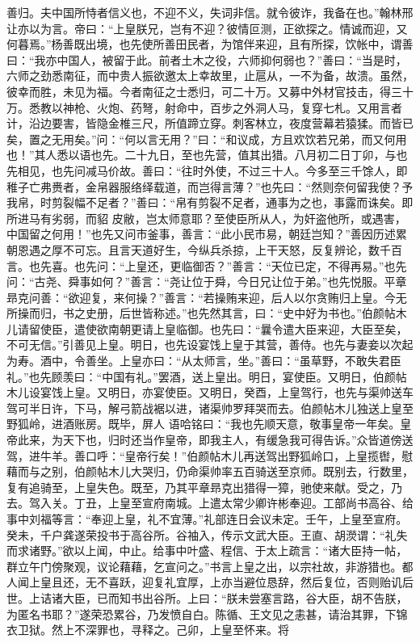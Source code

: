 \documentclass{article}
\begin{document}
\newpage
善归。夫中国所恃者信义也，不迎不义，失词非信。就令彼诈，我备在也。”翰林邢让亦以为言。帝曰：“上皇朕兄，岂有不迎？彼情叵测，正欲探之。情诚而迎，又何暮焉。”杨善既出境，也先使所善田民者，为馆伴来迎，且有所探，饮帐中，谓善曰：“我亦中国人，被留于此。前者土木之役，六师抑何弱也？”善曰：“当是时，六师之劲悉南征，而中贵人振欲邀太上幸故里，止扈从，一不为备，故溃。虽然，彼幸而胜，未见为福。今者南征之士悉归，可二十万。又募中外材官技击，得三十万。悉教以神枪、火炮、药弩，射命中，百步之外洞人马，复穿七札。又用言者计，沿边要害，皆隐金椎三尺，所值蹄立穿。刺客林立，夜度营幕若猿猱。而皆已矣，置之无用矣。”问：“何以言无用？”曰：“和议成，方且欢饮若兄弟，而又何用也！”其人悉以语也先。二十九日，至也先营，值其出猎。八月初二日丁卯，与也先相见，也先问减马价故。善曰：“往时外使，不过三十人。今多至三千馀人，即稚子亡弗赉者，金帛器服络绎载道，而岂得言薄？”也先曰：“然则奈何留我使？予我帛，时剪裂幅不足者？”善曰：“帛有剪裂不足者，通事为之也，事露而诛矣。即所进马有劣弱，而貂
\newpage
皮敝，岂太师意耶？至使臣所从人，为奸盗他所，或遇害，中国留之何用！”也先又问市釜事，善言：“此小民市易，朝廷岂知？”善因历述累朝恩遇之厚不可忘。且言天道好生，今纵兵杀掠，上干天怒，反复辨论，数千百言。也先喜。也先问：“上皇还，更临御否？”善言：“天位已定，不得再易。”也先问：“古尧、舜事如何？”善言：“尧让位于舜，今日兄让位于弟。”也先悦服。平章昻克问善：“欲迎复，来何操？”善言：“若操贿来迎，后人以尔贪贿归上皇。今无所操而归，书之史册，后世皆称述。”也先然其言，曰：“史中好为书也。”伯颜帖木儿请留使臣，遣使欲南朝更请上皇临御。也先曰：“曩令遣大臣来迎，大臣至矣，不可无信。”引善见上皇。明日，也先设宴饯上皇于其营，善侍。也先与妻妾以次起为寿。酒中，令善坐。上皇亦曰：“从太师言，坐。”善曰：“虽草野，不敢失君臣礼。”也先顾羡曰：“中国有礼。”罢酒，送上皇出。明日，宴使臣。又明日，伯颜帖木儿设宴饯上皇。又明日，亦宴使臣。又明日，癸酉，上皇驾行，也先与渠帅送车驾可半日许，下马，解弓箭战裾以进，诸渠帅罗拜哭而去。伯颜帖木儿独送上皇至野狐岭，进酒账房。既毕，屏人
\newpage
语哈铭曰：“我也先顺天意，敬事皇帝一年矣。皇帝此来，为天下也，归时还当作皇帝，即我主人，有缓急我可得告诉。”众皆道傍送驾，进牛羊。善口呼：“皇帝行矣！”伯颜帖木儿再送驾出野狐岭口，上皇揽辔，慰藉而与之别，伯颜帖木儿大哭归，仍命渠帅率五百骑送至京师。既别去，行数里，复有追骑至，上皇失色。既至，乃其平章昻克出猎得一獐，驰使来献。受之，乃去。驾入关。丁丑，上皇至宣府南城。上遣太常少卿许彬奉迎。工部尚书高谷、给事中刘福等言：“奉迎上皇，礼不宜薄。”礼部连日会议未定。壬午，上皇至宣府。癸未，千户龚遂荣投书于高谷所。谷袖入，传示文武大臣。王直、胡濙谓：“礼失而求诸野。”欲以上闻，中止。给事中叶盛、程信、于太上疏言：“诸大臣持一帖，群立午门傍聚观，议论藉藉，乞宣问之。”书言上皇之出，以宗社故，非游猎也。都人闻上皇且还，无不喜跃，迎复礼宜厚，上亦当避位恳辞，然后复位，否则贻讥后世。上诘诸大臣，已而知书出谷所。上曰：“朕未尝塞言路，谷大臣，胡不告朕，为匿名书耶？”遂荣恐累谷，乃发愤自白。陈循、王文见之恚甚，请治其罪，下锦衣卫狱。然上不深罪也，寻释之。己卯，上皇至怀来。将
\end{document}
